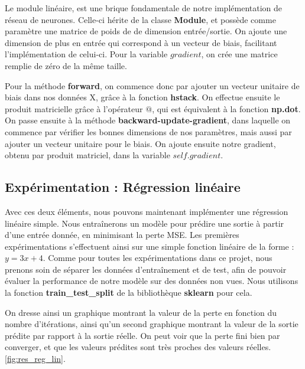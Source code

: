 \documentclass{article}
\begin{document}
Le module linéaire, est une brique fondamentale de notre implémentation de réseau de neurones. Celle-ci hérite de la classe \textbf{Module}, et possède comme paramètre une matrice de poids de de dimension entrée/sortie. On ajoute une dimension de plus en entrée qui correspond à un vecteur de biais, facilitant l'implémentation de celui-ci. Pour la variable $gradient$, on crée une matrice remplie de zéro de la même taille.

Pour la méthode \textbf{forward}, on commence donc par ajouter un vecteur unitaire de biais dans nos données X, grâce à la fonction \textbf{hstack}. On effectue ensuite le produit matricielle grâce à l'opérateur $@$, qui est équivalent à la fonction \textbf{np.dot}.\\
On passe ensuite à la méthode \textbf{backward-update-gradient}, dans laquelle on commence par vérifier les bonnes dimensions de nos paramètres, mais aussi par ajouter un vecteur unitaire pour le biais. On ajoute ensuite notre gradient, obtenu par produit matriciel, dans la variable $self.gradient$.

\subsection{Expérimentation : Régression linéaire}

Avec ces deux éléments, nous pouvons maintenant implémenter une régression linéaire simple. Nous entraînerons un modèle pour prédire une sortie à partir d'une entrée donnée, en minimisant la perte MSE. Les premières expérimentations s'effectuent ainsi sur une simple fonction linéaire de la forme : $y=3x+4$. Comme pour toutes les expérimentations dans ce projet, nous prenons soin de séparer les données d'entraînement et de test, afin de pouvoir évaluer la performance de notre modèle sur des données non vues. Nous utilisons la fonction \textbf{train\_test\_split} de la bibliothèque \textbf{sklearn} pour cela.

On dresse ainsi un graphique montrant la valeur de la perte en fonction du nombre d'itérations, ainsi qu'un second graphique montrant la valeur de la sortie prédite par rapport à la sortie réelle. On peut voir que la perte fini bien par converger, et que les valeurs prédites sont très proches des valeurs réelles. \ref{fig:res_reg_lin}.
\end{document}
